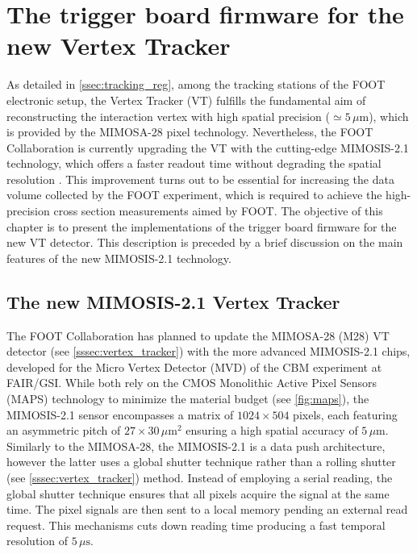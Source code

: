 \chapter{The trigger board firmware for the new Vertex Tracker}\label{ch:trigger_board}
As detailed in \autoref{ssec:tracking_reg}, among the tracking stations of the FOOT electronic setup, the Vertex Tracker (VT) fulfills the fundamental aim of reconstructing the interaction vertex with high spatial precision ($\simeq5\,\mu\mathrm{m}$), which is provided by the MIMOSA-28 pixel technology. Nevertheless, the FOOT Collaboration is currently upgrading the VT with the cutting-edge MIMOSIS-2.1 technology, which offers a faster readout time without degrading the spatial resolution \cite{Rabaglia_2026}. This improvement turns out to be essential for increasing the data volume collected by the FOOT experiment, which is required to achieve the high-precision cross section measurements aimed by FOOT. The objective of this chapter is to present the implementations of the trigger board firmware for the new VT detector. This description is preceded by a brief discussion on the main features of the new MIMOSIS-2.1 technology.
\section{The new MIMOSIS-2.1 Vertex Tracker}\label{sec:new_vertex_tracker}
The FOOT Collaboration has planned to update the MIMOSA-28 (M28) VT detector (see \autoref{sssec:vertex_tracker}) with the more advanced MIMOSIS-2.1 chips, developed for the Micro Vertex Detector (MVD) of the CBM experiment at FAIR/GSI. While both rely on the CMOS Monolithic Active Pixel Sensors (MAPS) technology to minimize the material budget (see \autoref{fig:maps}), the MIMOSIS-2.1 sensor encompasses a matrix of $1024\times504$ pixels, each featuring an asymmetric pitch of $27\times30\,\mu\mathrm{m}^2$ ensuring a high spatial accuracy of $5\,\mu\mathrm{m}$. Similarly to the MIMOSA-28, the MIMOSIS-2.1 is a data push architecture, however the latter uses a global shutter technique rather than a rolling shutter (see \autoref{sssec:vertex_tracker}) method. Instead of employing a serial reading, the global shutter technique ensures that all pixels acquire the signal at the same time. The pixel signals are then sent to a local memory pending an external read request. This mechanisms cuts down reading time producing a fast temporal resolution of $5\,\mu\mathrm{s}$.


